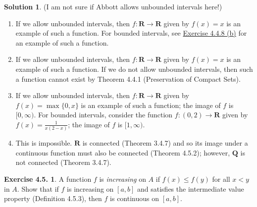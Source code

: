\documentclass[12pt]{article}
\theoremstyle{definition}
\theoremstyle{exercise}
\newtheorem{exercise}{Exercise 4.5.}
\theoremstyle{solution}
\newtheorem*{solution}{Solution}
\newcommand{\Q}{\mathbf{Q}}
\newcommand{\R}{\mathbf{R}}
\begin{document}
\begin{solution}
    (I am not sure if Abbott allows unbounded intervals here!)
    \begin{enumerate}
        \item If we allow unbounded intervals, then \( f : \R \to \R \) given by \( f(x) = x \) is an example of such a function. For bounded intervals, see \href{https://lew98.github.io/Mathematics/UA_Section_4_4_Exercises.pdf}{Exercise 4.4.8 (b)} for an example of such a function.
        
        \item If we allow unbounded intervals, then \( f : \R \to \R \) given by \( f(x) = x \) is an example of such a function. If we do not allow unbounded intervals, then such a function cannot exist by Theorem 4.4.1 (Preservation of Compact Sets).

        \item If we allow unbounded intervals, then \( f : \R \to \R \) given by \( f(x) = \max \{ 0, x \} \) is an example of such a function; the image of \( f \) is \( [0, \infty) \). For bounded intervals, consider the function \( f : (0, 2) \to \R \) given by \( f(x) = \tfrac{1}{x(2 - x)} \); the image of \( f \) is \( [1, \infty) \).

        \item This is impossible. \( \R \) is connected (Theorem 3.4.7) and so its image under a continuous function must also be connected (Theorem 4.5.2); however, \( \Q \) is not connected (Theorem 3.4.7).
    \end{enumerate}
\end{solution}

\begin{exercise}
\label{ex:3}
    A function \( f \) is \textit{increasing} on \( A \) if \( f(x) \leq f(y) \) for all \( x < y \) in \( A \). Show that if \( f \) is increasing on \( [a, b] \) and satisfies the intermediate value property (Definition 4.5.3), then \( f \) is continuous on \( [a, b] \).
\end{exercise}
\end{document}
